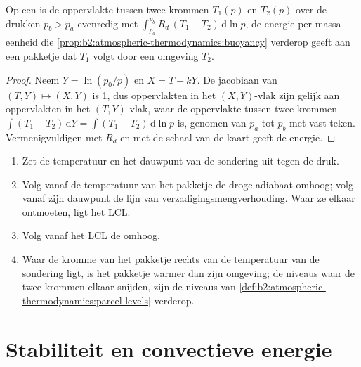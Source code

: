 \begin{proposition}\label{prop:b2:atmospheric-thermodynamics:areas}
Op een  is de oppervlakte tussen twee krommen $T_1(p)$ en $T_2(p)$ over de
drukken $p_b > p_a$ evenredig met $\int_{p_a}^{p_b} R_d\,(T_1 - T_2)\,\mathrm{d}\ln p$,
de energie per massa-eenheid die \cref{prop:b2:atmospheric-thermodynamics:buoyancy} verderop geeft aan
een pakketje dat $T_1$ volgt door een omgeving $T_2$.
\end{proposition}

\begin{proof}
Neem $Y = \ln(p_0/p)$ en $X = T + kY$. De jacobiaan van $(T, Y) \mapsto (X, Y)$ is 1, dus oppervlakten in
het $(X, Y)$-vlak zijn gelijk aan oppervlakten in het $(T, Y)$-vlak, waar de oppervlakte tussen twee krommen
$\int (T_1 - T_2)\,\mathrm{d}Y = \int (T_1 - T_2)\,\mathrm{d}\ln p$ is, genomen van $p_a$ tot $p_b$
met vast teken. Vermenigvuldigen met $R_d$ en met de schaal van de kaart geeft de energie.
\end{proof}

\begin{method}\label{met:b2:atmospheric-thermodynamics:lift}
\begin{enumerate}
  \item Zet de temperatuur en het dauwpunt van de sondering uit tegen de druk.
  \item Volg vanaf de temperatuur van het pakketje de droge adiabaat omhoog; volg vanaf zijn dauwpunt
        de lijn van verzadigingsmengverhouding. Waar ze elkaar ontmoeten, ligt het LCL.
  \item Volg vanaf het LCL de  omhoog.
  \item Waar de kromme van het pakketje rechts van de temperatuur van de sondering ligt, is het pakketje
        warmer dan zijn omgeving; de niveaus waar de twee krommen elkaar snijden, zijn de niveaus van
        \cref{def:b2:atmospheric-thermodynamics:parcel-levels} verderop.
\end{enumerate}
\end{method}


\section{Stabiliteit en convectieve energie}\label{sec:b2:atmospheric-thermodynamics:stability}

